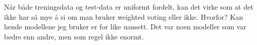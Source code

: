Når både treningsdata og test-data er uniformt fordelt, kan det virke som at det ikke har så mye å si om man bruker weighted voting eller ikke. Hvorfor? Kan hende modellene jeg bruker er for like uansett. Det var noen modeller som var bedre enn andre, men som regel ikke enormt.
